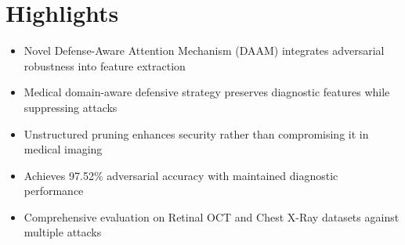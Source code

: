 \documentclass{article}
\begin{document}
\section*{Highlights}

\begin{itemize}
    \item Novel Defense-Aware Attention Mechanism (DAAM) integrates adversarial robustness into feature extraction
    \item Medical domain-aware defensive strategy preserves diagnostic features while suppressing attacks
    \item Unstructured pruning enhances security rather than compromising it in medical imaging
    \item Achieves 97.52\% adversarial accuracy with maintained diagnostic performance
    \item Comprehensive evaluation on Retinal OCT and Chest X-Ray datasets against multiple attacks
\end{itemize}
\end{document}
